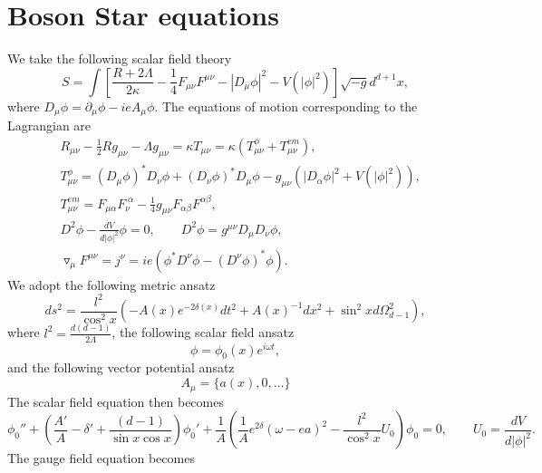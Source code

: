 \documentclass[a4paper,12pt]{article}
\begin{document}
\section{Boson Star equations}
We take the following scalar field theory
\begin{equation}
S = \int\left[\frac{R + 2\Lambda}{2\kappa} - \frac{1}{4}F_{\mu\nu} F^{\mu\nu} - |D_\mu \phi|^2 - V(|\phi|^2) \right]\sqrt{-g} d^{d+1} x,
\end{equation}
where $D_\mu\phi = \partial_\mu\phi - i e A_\mu\phi$.
The equations of motion corresponding to the Lagrangian are
\begin{subequations}
\begin{align}
	&R_{\mu\nu} - \frac{1}{2}R g_{\mu\nu} - \Lambda g_{\mu\nu} = \kappa T_{\mu\nu} = \kappa (T_{\mu\nu}^\phi + T_{\mu\nu}^{em}),\\
	&T_{\mu\nu}^\phi = (D_\mu \phi)^* D_\nu \phi + (D_\nu \phi)^* D_\mu \phi - g_{\mu\nu}(|D_\alpha \phi|^2 + V(|\phi|^2)),\\
	&T_{\mu\nu}^{em} = F_{\mu\alpha} F^{\;\alpha}_\nu - \frac{1}{4} g_{\mu\nu }F_{\alpha\beta}F^{\alpha\beta},\\
	&D^2 \phi - \frac{dV}{d |\phi|^2} \phi = 0,\qquad D^2\phi = g^{\mu\nu} D_\mu D_\nu \phi,\\
	&\triangledown_\mu F^{\mu\nu} = j^\nu = i e (\phi^* D^\nu \phi - (D^\nu\phi)^* \phi).
\end{align}
\end{subequations}
We adopt the following metric ansatz 
\begin{equation}
	\label{eq:AdSAnsatz}
	ds^2 = \frac{l^2}{\cos^2 x}\left(- A(x) e^{-2\delta(x)} dt^2 + A(x)^{-1} dx^2 + \sin^2 x d\Omega^2_{d-1}\right),
\end{equation}
where $l^2 = \frac{d(d-1)}{2 \Lambda}$, the following scalar field ansatz
\begin{equation}
	\phi = \phi_0(x) e^{i\omega t},
\end{equation}
and the following vector potential ansatz
\begin{equation}
	A_\mu = \{a(x),0,\dots\}
\end{equation}
The scalar field equation then becomes
\begin{equation}
	\phi_0'' + \left(\frac{A'}{A} - \delta' + \frac{(d-1)}{\sin x \cos x}\right)\phi_0' + \frac{1}{A}\left(\frac{1}{A}e^{2\delta}(\omega - e a)^2 - \frac{l^2}{\cos^2 x } U_0\right) \phi_0 = 0,\qquad U_0 = \frac{d V}{d |\phi|^2}.
\end{equation}
The gauge field equation becomes
\end{document}
